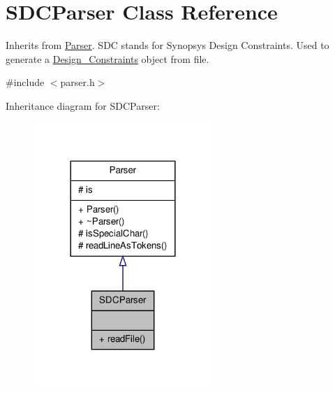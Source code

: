 \hypertarget{classSDCParser}{\section{S\-D\-C\-Parser Class Reference}
\label{classSDCParser}
}


Inherits from \hyperlink{classParser}{Parser}. S\-D\-C stands for Synopsys Design Constraints. Used to generate a \hyperlink{classDesign__Constraints}{Design\-\_\-\-Constraints} object from file.  




{\ttfamily \#include $<$parser.\-h$>$}



Inheritance diagram for S\-D\-C\-Parser\-:\nopagebreak
\begin{figure}[H]
\begin{center}
\leavevmode
\includegraphics[width=192pt]{classSDCParser__inherit__graph}
\end{center}
\end{figure}


